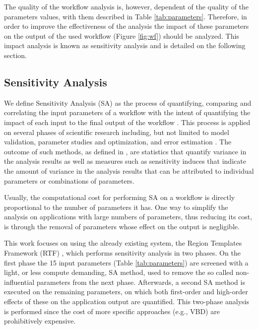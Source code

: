 The quality of the workflow analysis is, however, dependent of the quality of the parameters values, with them described in Table \ref{tab:parameters}. Therefore, in order to improve the effectiveness of the analysis the impact of these parameters on the output of the used workflow (Figure \ref{fig:wf}) should be analyzed. This impact analysis is known as sensitivity analysis and is detailed on the following section.

\subsection{Sensitivity Analysis}


We define Sensitivity Analysis (SA) as the process of quantifying, comparing and correlating the input parameters of a workflow with the intent of quantifying the impact of each input to the final output of the workflow \cite{sa}. This process is applied on several phases of scientific research including, but not limited to model validation, parameter studies and optimization, and error estimation \cite{sa2}. The outcome of such methods, as defined in \cite{rtf2}, are statistics that quantify variance in the analysis results as well as measures such as sensitivity induces that indicate the amount of variance in the analysis results that can be attributed to individual parameters or combinations of parameters.

Usually, the computational cost for performing SA on a workflow is directly proportional to the number of parameters it has. One way to simplify the analysis on applications with large numbers of parameters, thus reducing its cost, is through the removal of parameters whose effect on the output is negligible.

This work focuses on using the already existing system, the Region Templates Framework (RTF) \cite{rtf1,rtf2}, which performs sensitivity analysis in two phases. On the first phase the 15 input parameters (Table \ref{tab:parameters}) are screened with a light, or less compute demanding,  SA method, used to remove the so called non-influential parameters from the next phase. Afterwards, a second SA method is executed on the remaining parameters, on which both first-order and high-order effects of these on the application output are quantified. This two-phase analysis is performed since the cost of more specific approaches (e.g., VBD) are prohibitively expensive.

